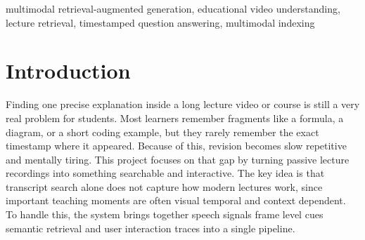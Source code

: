 \documentclass[conference]{IEEEtran}
\begin{document}
    \begin{abstract}
    Long educational videos are often difficult to navigate when learners need a specific explanation or visual example quickly. Finding the right moment in a lecture usually involves manual searching, and educators often have limited visibility into which parts of a video students struggle with the most. To address this problem, we propose EduRAG, a multimodal Retrieval-Augmented Generation framework for educational platforms that lets users ask questions in natural language and receive the most relevant video segments along with a generated response. The system first processes each video by transcribing speech with Faster-Whisper and extracting important visual frames using Structural Similarity Index (SSIM) based sampling. These frames are then analyzed with OCR and when needed, a VLM to maintain a balance between accuracy and computational efficiency. The extracted audio and visual information is divided into segments and stored in a hybrid retrieval system that combines vector-based semantic search with a knowledge graph for conceptual linking. To improve retrieval, an LLM-based routing module classifies queries as conceptual, temporal, or visual while preserving context across follow-up questions. In addition, user interaction signals such as repeated views and query behavior are used to identify difficult topics and provide educators with useful feedback for improving content delivery. This approach makes educational video learning more interactive, efficient, and targeted. Code is available at: https://github.com/pranavraj012/multimodal-rag
    \end{abstract}

    \begin{IEEEkeywords}
    multimodal retrieval-augmented generation, educational video understanding, lecture retrieval, timestamped question answering, multimodal indexing
    \end{IEEEkeywords}

    \section{Introduction}
    Finding one precise explanation inside a long lecture video or course is still a very real problem for students. Most learners remember fragments like a formula, a diagram, or a short coding example, but they rarely remember the exact timestamp where it appeared. Because of this, revision becomes slow repetitive and mentally tiring. This project focuses on that gap by turning passive lecture recordings into something searchable and interactive. The key idea is that transcript search alone does not capture how modern lectures work, since important teaching moments are often visual temporal and context dependent. To handle this, the system brings together speech signals frame level cues semantic retrieval and user interaction traces into a single pipeline.
\end{document}

